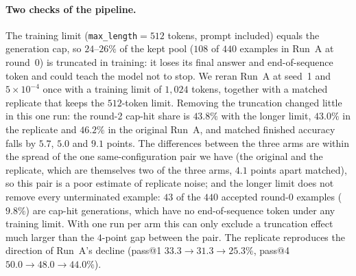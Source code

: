 \documentclass[runningheads]{llncs}
\begin{document}
\paragraph{Two checks of the pipeline.}
The training limit (\texttt{max\_length}$=512$ tokens, prompt included) equals the
generation cap, so $24$--$26\%$ of the kept pool ($108$ of $440$ examples in Run~A
at round~0) is truncated in training: it loses its final answer and
end-of-sequence token and could teach the model not to stop. We reran Run~A at
seed~1 and $5\times10^{-4}$ once with a training limit of $1{,}024$ tokens,
together with a matched replicate that keeps the $512$-token limit. Removing the
truncation changed little in this one run: the round-2 cap-hit share is
$43.8\%$ with the longer limit, $43.0\%$ in the replicate and $46.2\%$ in the
original Run~A, and matched finished accuracy falls by $5.7$, $5.0$ and $9.1$
points. The differences between the three arms are within the spread of the
one same-configuration pair we have (the original and the replicate, which are
themselves two of the three arms, $4.1$ points apart matched), so this pair is
a poor estimate of replicate noise; and the longer limit does not remove
every unterminated example: $43$ of the $440$ accepted round-0 examples
($9.8\%$) are cap-hit generations, which have no end-of-sequence token under
any training limit. With one run per arm this can only exclude a truncation
effect much larger than the $4$-point gap between the pair. The replicate reproduces the
direction of Run~A's decline (pass@1 $33.3\to31.3\to25.3\%$, pass@4
$50.0\to48.0\to44.0\%$).
\end{document}
